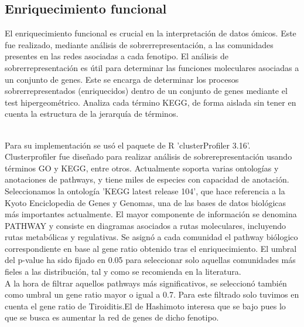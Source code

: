 \subsection*{Enriquecimiento funcional}
El enriquecimiento funcional es crucial en la interpretación de datos ómicos. Este fue realizado, mediante análisis de sobrerrepresentación, a las comunidades presentes en las redes asociadas a cada fenotipo. El análisis de sobrerrepresentación es útil para determinar las funciones moleculares asociadas a un conjunto de genes. Este se encarga de determinar los procesos sobrerrepresentados (enriquecidos) dentro de un conjunto de genes mediante el test hipergeométrico. Analiza cada término KEGG, de forma aislada sin tener en cuenta la estructura de la jerarquía de términos. \cite{Zhang2010}

\\
Para su implementación se usó el paquete de R 'clusterProfiler 3.16'. Clusterprofiler fue diseñado para realizar análisis de sobrerepresentación usando términos GO y KEGG, entre otros. Actualmente soporta varias ontologías y anotaciones de pathways, y tiene miles de especies con capacidad de anotación. 
\\
Seleccionamos la ontología 'KEGG latest release 104', que  hace referencia a la Kyoto Enciclopedia de Genes y Genomas, una de las bases de datos biológicas más importantes actualmente. El mayor componente de información se denomina PATHWAY y consiste en diagramas asociados a rutas moleculares, incluyendo rutas metabólicas y regulativas. 
Se asignó a cada comunidad el pathway biólogico correspondiente en base al gene ratio obtenido tras el enriquecimiento.  El umbral del p-value ha sido fijado  en 0.05 para seleccionar solo aquellas comunidades más fieles a las distribución, tal y como se recomienda en la literatura.\cite{Jafari2018} \\  A la hora de filtrar aquellos pathways más significativos, se seleccionó también como umbral un gene ratio mayor o igual a 0.7. Para este filtrado solo tuvimos en cuenta el gene ratio de Tiroiditis.El de Hashimoto interesa que se bajo pues lo que se busca es aumentar la red de genes de dicho fenotipo.
 

